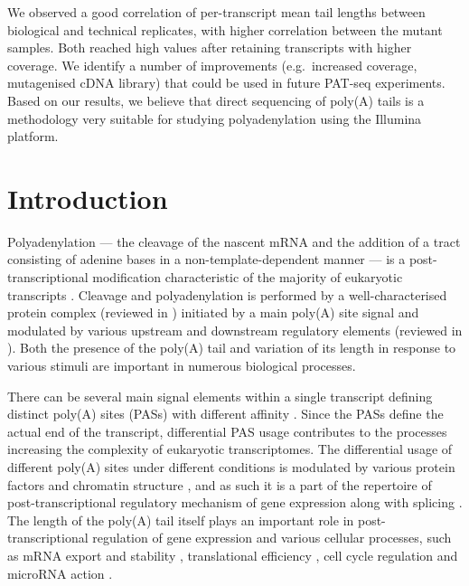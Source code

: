 \documentclass[10pt]{article}
\begin{document}
We observed a good correlation of per-transcript mean tail lengths between biological and technical replicates, with higher correlation between the mutant samples. Both reached high values after retaining transcripts with higher coverage. We identify a number of improvements (e.g.~increased coverage, mutagenised cDNA library) that could be used in future PAT-seq experiments. Based on our results, we believe that direct sequencing of poly(A) tails is a methodology very suitable for studying polyadenylation using the Illumina platform.

\section*{Introduction}

Polyadenylation --- the cleavage of the nascent mRNA and the addition of a tract consisting of adenine bases in a non-template-dependent manner --- is a post-transcriptional modification characteristic of the majority of eukaryotic transcripts \cite{zhao99,elkon13,tian13}. Cleavage and polyadenylation is performed by a well-characterised protein complex (reviewed in \cite{zhao99}) initiated by a main poly(A) site signal and modulated by various upstream and downstream regulatory elements (reviewed in \cite{tian11,weill12}). Both the presence of the poly(A) tail and variation of its length in response to various stimuli are important in numerous biological processes.

There can be several main signal elements within a single transcript defining distinct poly(A) sites (PASs) with different affinity \cite{tian13,elkon13}. Since the PASs define the actual end of the transcript, differential PAS usage contributes to the processes increasing the complexity of eukaryotic transcriptomes. The differential usage of different poly(A) sites under different conditions is modulated by various protein factors and chromatin structure \cite{tian13}, and as such it is a part of the repertoire of post-transcriptional regulatory mechanism of gene expression along with splicing \cite{licatalosi10}. The length of the poly(A) tail itself plays an important role in post-transcriptional regulation of gene expression and various cellular processes, such as mRNA export \cite{fuke07} and stability \cite{lackner07,eckmann11,weill12}, translational efficiency \cite{weill12}, cell cycle regulation \cite{mendez01} and microRNA action \cite{moretti12}.
\end{document}
